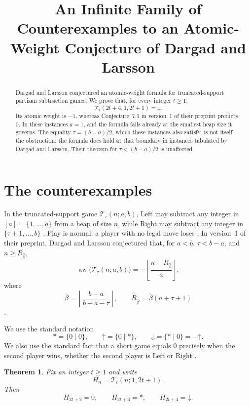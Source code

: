 \documentclass[11pt]{amsart}
\title[Counterexamples to an atomic-weight conjecture]
{An Infinite Family of Counterexamples to an Atomic-Weight Conjecture
of Dargad and Larsson}
\date{}
\newtheorem{theorem}{Theorem}
\theoremstyle{remark}
\newcommand{\TS}{\mathcal{T}}
\newcommand{\Up}{\mathord{\uparrow}}
\newcommand{\Down}{\mathord{\downarrow}}
\newcommand{\aw}{\operatorname{aw}}
\begin{document}
\begin{abstract}
Dargad and Larsson conjectured an atomic-weight formula for
truncated-support partizan subtraction games. We prove that, for every
integer $t\geq1$,
\[
  \TS_t(2t+4;1,2t+1)=\Down.
\]
Its atomic weight is $-1$, whereas Conjecture~7.1 in version~1 of their
preprint predicts $0$. In these instances $a=1$, and the formula fails
already at the smallest heap size it governs. The equality
$\tau=(b-a)/2$, which these instances also satisfy, is not itself the
obstruction: the formula does hold at that boundary in instances
tabulated by Dargad and Larsson. Their theorem for $\tau<(b-a)/2$ is
unaffected.
\end{abstract}

\maketitle

\section{The counterexamples}

In the truncated-support game $\TS_\tau(n;a,b)$, Left may subtract any
integer in $[a]=\{1,\dots,a\}$ from a heap of size $n$, while Right may
subtract any integer in $\{\tau+1,\dots,b\}$
\cite[Definition~5.1]{DL}. Play is normal: a player with no legal move
loses \cite{ANW}. In version~1 of their preprint, Dargad and
Larsson conjectured that, for $a<b$, $\tau<b-a$, and
$n\geq R_{\widehat\beta}$,
\begin{equation}\label{eq:conjecture}
  \aw\bigl(\TS_\tau(n;a,b)\bigr)
  =-
  \left\lfloor
    \frac{n-R_{\widehat\beta}}{a}
  \right\rfloor,
\end{equation}
where
\[
  \widehat\beta=
  \left\lfloor\frac{b-a}{b-a-\tau}\right\rfloor,
  \qquad
  R_{\widehat\beta}=\widehat\beta(a+\tau+1)
\]
\cite[Equations~(5), (13), and Conjecture~7.1]{DL}.

We use the standard notation
\[
  *=\{0\mid0\},
  \qquad
  \Up=\{0\mid *\},
  \qquad
  \Down=\{*\mid0\}=-\Up.
\]
We also use the standard fact that a short game equals $0$ precisely
when the second player wins, whether the second player is Left or Right
\cite{ANW}.

\begin{theorem}\label{thm:family}
Fix an integer $t\geq1$ and write
\[
  H_n=\TS_t(n;1,2t+1).
\]
Then
\[
  H_{2t+2}=0,
  \qquad
  H_{2t+3}=*,
  \qquad
  H_{2t+4}=\Down.
\]
\end{theorem}
\end{document}
